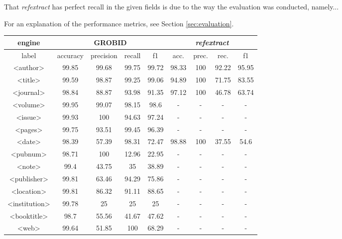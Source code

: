 That \emph{refextract} has perfect recall in the given fields is due to the way the evaluation was conducted, namely...

For an explanation of the performance metrics, see Section \ref{sec:evaluation}.

\begin{table}[h]
\begin{center}
\begin{tabular}{|c|cccc|cccc|}
\hline
engine &  \multicolumn{4}{|c|}{GROBID} & \multicolumn{4}{c|}{\emph{refextract}}\\
\hline
label & accuracy & precision & recall & f1 & acc. & prec. & rec. & f1\\
\hline
<author>    & 99.85 &   99.68   &   99.75   &   99.72   & 98.33 &   100 &   92.22   &   95.95   \\
<title> &   99.59   &   98.87   &   99.25   &   99.06   & 94.89 &   100 &   71.75   &   83.55   \\
<journal>   & 98.84 &   88.87   &   93.98   &   91.35   & 97.12 &   100 &   46.78   &   63.74   \\
<volume>&   99.95   &   99.07   &   98.15   &   98.6    & -     &   -   &   -       &   -   \\
<issue> &   99.93   &   100     &   94.63   &   97.24   & -     &   -   &   -       &   -   \\
<pages> &   99.75   &   93.51   &   99.45   &   96.39   & -     &   -   &   -       &   -   \\
<date>  &   98.39   &   57.39   &   98.31   &   72.47   & 98.88 &   100 &   37.55   &   54.6    \\
<pubnum>&   98.71   &   100     &   12.96   &   22.95   & -     &   -   &   -       &   -   \\
<note>  &   99.4    &   43.75   &   35      &   38.89   & -     &   -   &   -       &   -   \\
<publisher>&99.81   &   63.46   &   94.29   &   75.86   & -     &   -   &   -       &   -   \\
<location>& 99.81   &   86.32   &   91.11   &   88.65   & -     &   -   &   -       &   -   \\
<institution>& 99.78&   25      &   25      &   25      & -     &   -   &   -       &   -   \\
<booktitle>&    98.7&   55.56   &   41.67   &   47.62   & -     &   -   &   -       &   -   \\
<web>   &   99.64   &   51.85   &   100     &   68.29   & -     &   -   &   -       &   -   \\

\end{tabular}
\end{center}
\end{table}
